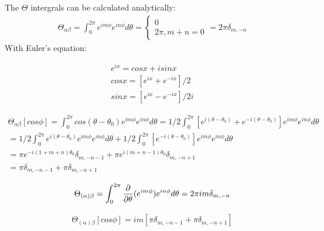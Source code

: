 \documentclass{Note}
\begin{document}
The $\Theta$ intergrals can be calculated analytically:
\begin{equation}
\begin{aligned}
\Theta_{\alpha\beta}=\int_0^{2\pi} e^{im\phi} e^{in\phi} d\theta=\left\{\begin{matrix}
0\\
2\pi, m+n=0
\end{matrix}\right.
=2\pi \delta_{m,-n}
\end{aligned}
\end{equation}
With Euler's equation:

\begin{equation}
\begin{aligned}
e^{ix}=cosx+isinx\\
cosx=[e^{ix}+e^{-ix}]/2\\
sinx=[e^{ix}-e^{-ix}]/2i
\end{aligned}
\end{equation}

\begin{equation}
\begin{aligned}
\Theta_{\alpha\beta}[cos\phi]=\int_0^{2\pi} cos(\theta-\theta_0) e^{im\phi} e^{in\phi} d\theta=1/2\int_0^{2\pi} [e^{i(\theta-\theta_0)}+e^{-i(\theta-\theta_0)}] e^{im\phi} e^{in\phi} d\theta\\
=1/2\int_0^{2\pi} e^{i(\theta-\theta_0)} e^{im\phi} e^{in\phi} d\theta+1/2\int_0^{2\pi} [e^{-i(\theta-\theta_0)}] e^{im\phi} e^{in\phi} d\theta\\
=\pi e^{-i(1+m+n)\theta_0}\delta_{m,-n-1}+\pi e^{i(m+n-1)\theta_0}\delta_{m,-n+1}\\
=\pi \delta_{m,-n-1}+\pi \delta_{m,-n+1}
\end{aligned}
\end{equation}


\begin{equation}
\begin{aligned}
\Theta_{(\alpha)\beta}=\int_0^{2\pi} {\partial \over \partial \theta}(e^{im\phi}) e^{in\phi} d\theta
=2\pi im \delta_{m,-n}
\end{aligned}
\end{equation}


\begin{equation}
\begin{aligned}
\Theta_{(\alpha)\beta}[cos\phi]=im[ \pi \delta_{m,-n-1}+\pi \delta_{m,-n+1}]
\end{aligned}
\end{equation}
\end{document}
